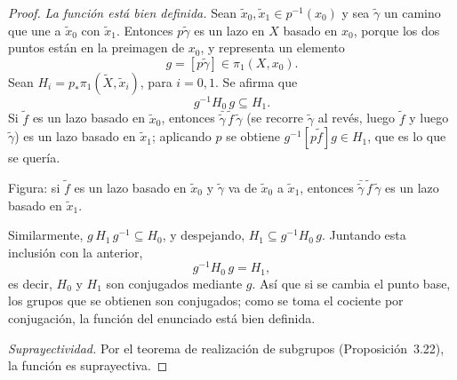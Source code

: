 \documentclass[11pt]{article}
\begin{document}
\begin{proof}
\emph{La función está bien definida.} Sean $\tilde x_0,\tilde x_1\in p^{-1}(x_0)$ y sea $\tilde\gamma$ un camino que une a $\tilde x_0$ con $\tilde x_1$. Entonces $p\tilde\gamma$ es un lazo en $X$ basado en $x_0$, porque los dos puntos están en la preimagen de $x_0$, y representa un elemento
\[
  g=[p\tilde\gamma]\in\pi_1(X,x_0).
\]
Sean $H_i=p_*\pi_1(\tilde X,\tilde x_i)$, para $i=0,1$. Se afirma que
\[
  g^{-1}H_0\,g\subseteq H_1 .
\]
Si $\tilde f$ es un lazo basado en $\tilde x_0$, entonces $\bar{\tilde\gamma}\,\tilde f\,\tilde\gamma$ (se recorre $\tilde\gamma$ al revés, luego $\tilde f$ y luego $\tilde\gamma$) es un lazo basado en $\tilde x_1$; aplicando $p$ se obtiene $g^{-1}[p\tilde f]g\in H_1$, que es lo que se quería.

\begin{center}
\end{center}

\noindent Figura: si $\tilde f$ es un lazo basado en $\tilde x_0$ y $\tilde\gamma$ va de $\tilde x_0$ a $\tilde x_1$, entonces $\bar{\tilde\gamma}\,\tilde f\,\tilde\gamma$ es un lazo basado en $\tilde x_1$.

Similarmente, $g\,H_1\,g^{-1}\subseteq H_0$, y despejando, $H_1\subseteq g^{-1}H_0\,g$. Juntando esta inclusión con la anterior,
\[
  g^{-1}H_0\,g=H_1 ,
\]
es decir, $H_0$ y $H_1$ son conjugados mediante $g$. Así que si se cambia el punto base, los grupos que se obtienen son conjugados; como se toma el cociente por conjugación, la función del enunciado está bien definida.

\medskip\noindent\emph{Suprayectividad.} Por el teorema de realización de subgrupos (Proposición~3.22), la función es suprayectiva.


\end{proof}
\end{document}
